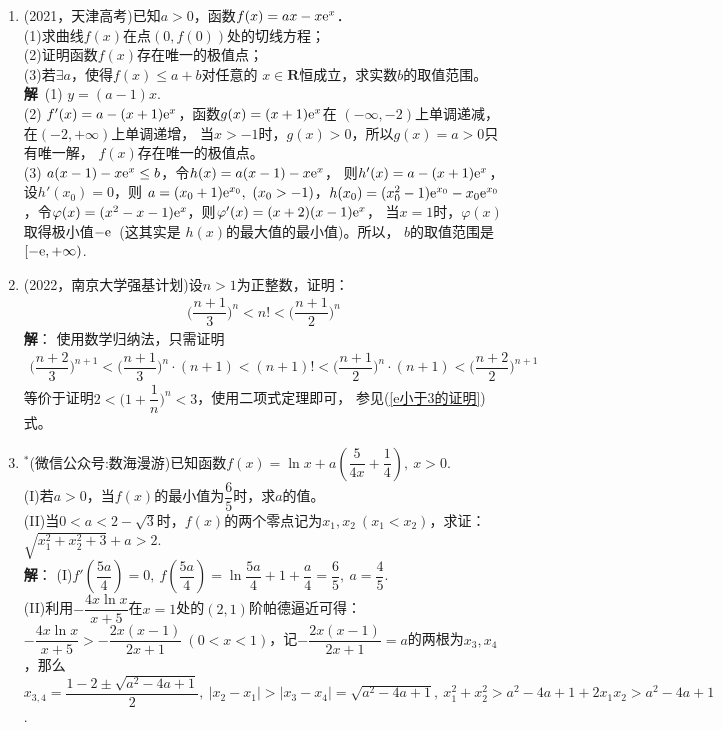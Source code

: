 \begin{enumerate}[label={\textbf{\arabic*.}},leftmargin=
    \inteval{\myenumleftmargin}pt]
\item (2021，天津高考)已知$ a>0 $，函数$ f(x)=ax-x\mathrm{e}^x $．\\
(1)求曲线$ f(x) $在点$ (0,f(0)) $处的切线方程；\\
(2)证明函数$ f(x) $存在唯一的极值点；\\
(3)若$ \exists a $，使得$ f(x)\leq a+b $对任意的
$ x\in \textbf{R} $恒成立，求实数$ b $的取值范围。\\
\textbf{解}\ (1) $ y=(a-1)x $. \\
(2) $ f'(x)=a-(x+1)\mathrm{e}^x $，函数$ g(x)=(x+1)\mathrm{e}^x $在
$ (-\infty,-2) $上单调递减，在$ (-2,+\infty) $上单调递增，
当$ x>-1 $时，$ g(x)>0 $，所以$ g(x)=a>0 $只有唯一解，
$ f(x) $存在唯一的极值点。\\
(3) $ a(x-1)-x\mathrm{e}^x\leq b $，令$ h(x)=a(x-1)-x\mathrm{e}^x $，
则$ h'(x)=a-(x+1)\mathrm{e}^x $，设$ h'(x_0)=0 $，则
$ a=(x_0+1)\e^{x_0},\ (x_0>-1) $，$ h(x_0)=(x_0^2-1)
\mathrm{e}^{x_0}-x_0\mathrm{e}^{x_0} $，令$ \varphi(x)=(x^2-x-1)
\mathrm{e}^{x} $，则$ \varphi'(x)=(x+2)(x-1)\mathrm{e}^x $，
当$ x=1 $时，$ \varphi(x) $取得极小值$ -\mathrm{e} $\, (这其实是
$ h(x) $的最大值的最小值)。所以，
$ b $的取值范围是$ [-\mathrm{e},+\infty) $.

\item (2022，南京大学强基计划)设$n>1$为正整数，证明：
\begin{align*}
    \Big(\dfrac{n+1}{3}\Big)^{n}<n!<\Big(\dfrac{n+1}{2}\Big)^{n}
\end{align*}
\ifteach \textbf{解}：
使用数学归纳法，只需证明
\begin{gather*}
    \Big(\dfrac{n+2}{3}\Big)^{n+1}<\Big(\dfrac{n+1}{3}\Big)^{n}
    \cdot (n+1)<(n+1)!<\Big(\dfrac{n+1}{2}\Big)^{n}\cdot (n+1)<\Big(\dfrac{n+2}{2}\Big)^{n+1}
\end{gather*}
等价于证明$ 2<\Big(1+\dfrac{1}{n}\Big)^{n}<3 $，使用二项式定理即可，
参见(\ref{e小于3的证明})式。
\fi

\item $ ^* $(微信公众号:数海漫游)已知函数$ f(x)=\ln x+a\left(\dfrac{5}{4x}+\dfrac{1}{4}\right),\ x>0 $.\\
(I)若$ a>0 $，当$ f(x) $的最小值为$ \dfrac{6}{5} $时，求$ a $的值。\\
(II)当$ 0<a<2-\sqrt{3} $时，$ f(x) $的两个零点记为$ x_1,x_2\ (x_1<x_2) $，求证：$ \sqrt{x_1^2+x_2^2+3}+a>2 $.
\ifteach \\ \textbf{解}：
(I)$ f'(\dfrac{5a}{4})=0,\ f(\dfrac{5a}{4})=\ln \dfrac{5a}{4}+1+\dfrac{a}{4}=\dfrac{6}{5},\ a=\dfrac{4}{5} $.\\
(II)利用$ -\dfrac{4x\ln x}{x+5} $在$ x=1 $处的$ (2,1) $阶帕德逼近可得：$ -\dfrac{4x\ln x}{x+5}>-\dfrac{2x(x-1)}{2x+1}\ (0<x<1) $，记$ -\dfrac{2x(x-1)}{2x+1}=a $的两根为$ x_3,x_4 $，那么$ x_{3,4}=\dfrac{1-2\pm \sqrt{a^2-4a+1}}{2},\  |x_2-x_1|>|x_3-x_4|=\sqrt{a^2-4a+1},\ x_1^2+x_2^2>a^2-4a+1+2x_1x_2>a^2-4a+1 $.
\fi


\end{enumerate}
